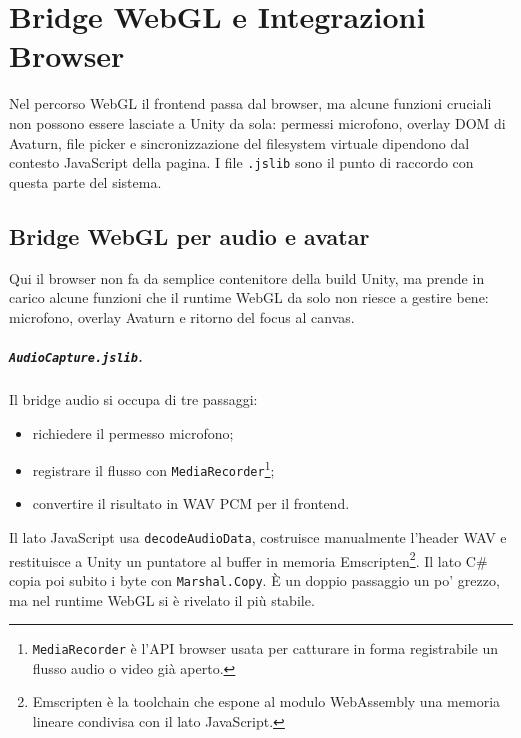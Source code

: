\chapter{Bridge WebGL e Integrazioni Browser}
\label{app:webgl-bridge}

Nel percorso WebGL il frontend passa dal browser, ma alcune funzioni cruciali non possono essere lasciate a Unity da sola: permessi microfono, overlay DOM di Avaturn, file picker e sincronizzazione del filesystem virtuale dipendono dal contesto JavaScript della pagina. I file \texttt{.jslib} sono il punto di raccordo con questa parte del sistema.

\section{Bridge WebGL per audio e avatar}
Qui il browser non fa da semplice contenitore della build Unity, ma prende in carico alcune funzioni che il runtime WebGL da solo non riesce a gestire bene: microfono, overlay Avaturn e ritorno del focus al canvas.

\paragraph{\normalfont\texttt{AudioCapture.jslib}.}
Il bridge audio si occupa di tre passaggi:
\begin{itemize}
\item richiedere il permesso microfono;
\item registrare il flusso con \texttt{MediaRecorder}\footnote{\texttt{MediaRecorder} è l'API browser usata per catturare in forma registrabile un flusso audio o video già aperto.};
\item convertire il risultato in WAV PCM per il frontend.
\end{itemize}

Il lato JavaScript usa \texttt{decodeAudioData}, costruisce manualmente l'header WAV e restituisce a Unity un puntatore al buffer in memoria Emscripten\footnote{Emscripten è la toolchain che espone al modulo WebAssembly una memoria lineare condivisa con il lato JavaScript.}. Il lato C\# copia poi subito i byte con \texttt{Marshal.Copy}. È un doppio passaggio un po' grezzo, ma nel runtime WebGL si è rivelato il più stabile.

